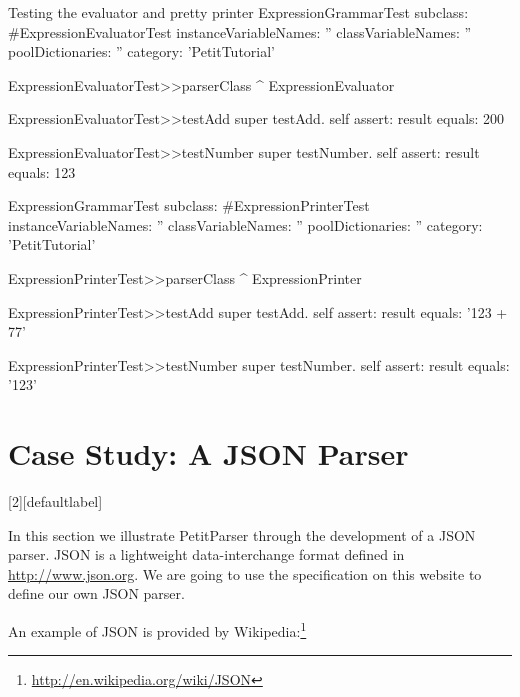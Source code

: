 \documentclass[a4paper,10pt,twoside]{book}
\begin{document}
\begin{script}{Testing the evaluator and pretty printer}
ExpressionGrammarTest subclass: #ExpressionEvaluatorTest
  instanceVariableNames: ''
  classVariableNames: ''
  poolDictionaries: ''
  category: 'PetitTutorial'

ExpressionEvaluatorTest>>parserClass
  ^ ExpressionEvaluator 

ExpressionEvaluatorTest>>testAdd
  super testAdd.
  self assert: result equals: 200

ExpressionEvaluatorTest>>testNumber
  super testNumber.
  self assert: result equals: 123

ExpressionGrammarTest subclass: #ExpressionPrinterTest
  instanceVariableNames: ''
  classVariableNames: ''
  poolDictionaries: ''
  category: 'PetitTutorial'

ExpressionPrinterTest>>parserClass
  ^ ExpressionPrinter 

ExpressionPrinterTest>>testAdd
  super testAdd.
  self assert: result equals: '123 + 77'

ExpressionPrinterTest>>testNumber
  super testNumber.
  self assert: result equals: '123'
\end{script}

\section{Case Study: A JSON Parser}

[2][defaultlabel]{%
\renewcommand{\lstlistingname}{Script}%
}{}
\newcommand{\syntaxjsonref}[1]{\figref{syntax-json-#1}}
\newcommand{\tikzgrammarjsonfig}[2]{%
  \begin{figure}
    \centering
    \tikzgrammar{#2}
    \caption{Syntax diagram representation for the JSON #1 parser defined in \scrref{json-#1}}
\label{fig:syntax-json-#1}
\end{figure}
}

In this section we illustrate PetitParser through the development of a
JSON parser. JSON is a lightweight data-interchange format defined in
\url{http://www.json.org}. We are going to use the specification on
this website to define our own JSON parser.

An example of JSON is provided by
Wikipedia:\footnote{\url{http://en.wikipedia.org/wiki/JSON}}
\end{document}
